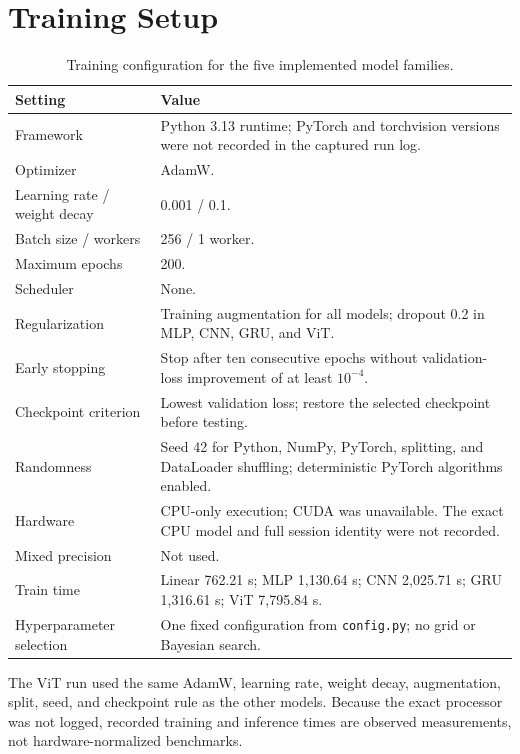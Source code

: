 \section{Training Setup}

\begin{table}[H]
    \centering
    \caption{Training configuration for the five implemented model families.}
    \label{tab:training-setup}
    \begin{tabularx}{\textwidth}{@{}lX@{}}
        \toprule
        Setting & Value \\
        \midrule
        Framework & Python 3.13 runtime; PyTorch and torchvision versions were not recorded in the captured run log. \\
        Optimizer & AdamW. \\
        Learning rate / weight decay & 0.001 / 0.1. \\
        Batch size / workers & 256 / 1 worker. \\
        Maximum epochs & 200. \\
        Scheduler & None. \\
        Regularization & Training augmentation for all models; dropout 0.2 in MLP, CNN, GRU, and ViT. \\
        Early stopping & Stop after ten consecutive epochs without validation-loss improvement of at least $10^{-4}$. \\
        Checkpoint criterion & Lowest validation loss; restore the selected checkpoint before testing. \\
        Randomness & Seed 42 for Python, NumPy, PyTorch, splitting, and DataLoader shuffling; deterministic PyTorch algorithms enabled. \\
        Hardware & CPU-only execution; CUDA was unavailable. The exact CPU model and full session identity were not recorded. \\
        Mixed precision & Not used. \\
        Train time & Linear 762.21 s; MLP 1,130.64 s; CNN 2,025.71 s; GRU 1,316.61 s; ViT 7,795.84 s. \\
        Hyperparameter selection & One fixed configuration from \texttt{config.py}; no grid or Bayesian search. \\
        \bottomrule
    \end{tabularx}
\end{table}

The ViT run used the same AdamW, learning rate, weight decay, augmentation, split, seed, and checkpoint rule as the other models. Because the exact processor was not logged, recorded training and inference times are observed measurements, not hardware-normalized benchmarks.
